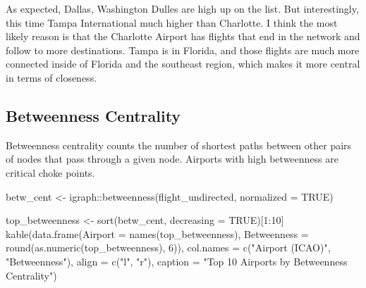 \documentclass[
  letterpaper,
]{report}
\newenvironment{Shaded}{}{}
\newcommand{\AttributeTok}[1]{\textcolor[rgb]{0.84,0.23,0.29}{#1}}
\newcommand{\ConstantTok}[1]{\textcolor[rgb]{0.00,0.36,0.77}{#1}}
\newcommand{\DecValTok}[1]{\textcolor[rgb]{0.00,0.36,0.77}{#1}}
\newcommand{\FunctionTok}[1]{\textcolor[rgb]{0.44,0.26,0.76}{#1}}
\newcommand{\NormalTok}[1]{\textcolor[rgb]{0.14,0.16,0.18}{#1}}
\newcommand{\OtherTok}[1]{\textcolor[rgb]{0.44,0.26,0.76}{#1}}
\newcommand{\SpecialCharTok}[1]{\textcolor[rgb]{0.00,0.36,0.77}{#1}}
\newcommand{\StringTok}[1]{\textcolor[rgb]{0.01,0.18,0.38}{#1}}
\begin{document}
As expected, Dallas, Washington Dulles are high up on the list. But
interestingly, this time Tampa International much higher than Charlotte.
I think the most likely reason is that the Charlotte Airport has flights
that end in the network and follow to more destinations. Tampa is in
Florida, and those flights are much more connected inside of Florida and
the southeast region, which makes it more central in terms of closeness.

\subsection{Betweenness Centrality}\label{betweenness-centrality}

Betweenness centrality counts the number of shortest paths between other
pairs of nodes that pass through a given node. Airports with high
betweenness are critical choke points.

\begin{Shaded}
\begin{Highlighting}[]
\NormalTok{betw\_cent }\OtherTok{\textless{}{-}}\NormalTok{ igraph}\SpecialCharTok{::}\FunctionTok{betweenness}\NormalTok{(flight\_undirected, }\AttributeTok{normalized =} \ConstantTok{TRUE}\NormalTok{)}

\NormalTok{top\_betweenness }\OtherTok{\textless{}{-}} \FunctionTok{sort}\NormalTok{(betw\_cent, }\AttributeTok{decreasing =} \ConstantTok{TRUE}\NormalTok{)[}\DecValTok{1}\SpecialCharTok{:}\DecValTok{10}\NormalTok{]}
\FunctionTok{kable}\NormalTok{(}\FunctionTok{data.frame}\NormalTok{(}\AttributeTok{Airport =} \FunctionTok{names}\NormalTok{(top\_betweenness),}
                 \AttributeTok{Betweenness =} \FunctionTok{round}\NormalTok{(}\FunctionTok{as.numeric}\NormalTok{(top\_betweenness), }\DecValTok{6}\NormalTok{)),}
      \AttributeTok{col.names =} \FunctionTok{c}\NormalTok{(}\StringTok{"Airport (ICAO)"}\NormalTok{, }\StringTok{"Betweenness"}\NormalTok{),}
      \AttributeTok{align =} \FunctionTok{c}\NormalTok{(}\StringTok{"l"}\NormalTok{, }\StringTok{"r"}\NormalTok{),}
      \AttributeTok{caption =} \StringTok{"Top 10 Airports by Betweenness Centrality"}\NormalTok{)}
\end{Highlighting}
\end{Shaded}
\end{document}
